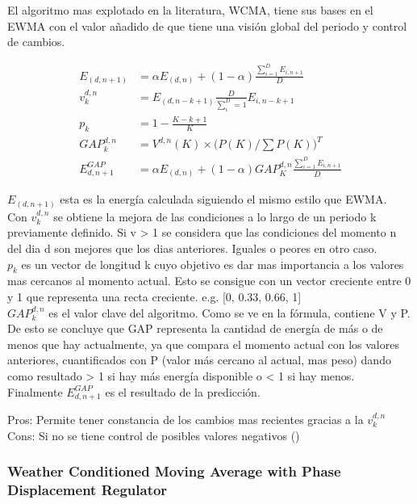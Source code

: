 El algoritmo mas explotado en la literatura, WCMA, tiene sus bases en el EWMA con el valor añadido de que tiene una visión global del periodo y control de cambios.



\begin{align}
	E_{(d,n+1)} &= \alpha E_{(d,n)} + (1-\alpha) \frac  {\sum_{i=1}^D E_{i,n+1}} {D} \\
	v^{d,n}_k &= E_{(d,n-k+1)} \frac {D}{\sum^D_i=1} E_{i,n-k+1} \\
	p_k &= 1-\frac {K-k+1}{K} \\
	GAP_k^{d,n} &= V^{d,n}(K) \times \big(P(K) / \sum P(K) \big)^T \\
	E^{GAP}_{d,n+1} &= \alpha E_(d,n) + (1-\alpha) GAP_K^{d,n} \frac{\sum^D_{i=1} E_{i,n+1}}{D}
\end{align}

$E_{(d,n+1)}$ esta es la energía calculada siguiendo el mismo estilo que EWMA. \\
Con $v^{d,n}_k$ se obtiene la mejora de las condiciones a lo largo de un periodo k previamente definido. Si v > 1 se considera que las condiciones del momento n del dia d son mejores que los dias anteriores. Iguales o peores en otro caso. \\ 
$p_k$ es un vector de longitud k cuyo objetivo es dar mas importancia a los valores mas cercanos al momento actual. Esto se consigue con un vector creciente entre 0 y 1 que representa una recta creciente. e.g. [0, 0.33, 0.66, 1] \\
$GAP_k^{d,n}$ es el valor clave del algoritmo. Como se ve en la fórmula, contiene V y P. De esto se concluye que GAP representa la cantidad de energía de más o de menos que hay actualmente, ya que compara el momento actual con los valores anteriores, cuantificados con P (valor más cercano al actual, mas peso) dando como resultado > 1 si hay más energía disponible o < 1 si hay menos. \\
Finalmente $E^{GAP}_{d,n+1}$ es el resultado de la predicción.


Pros: Permite tener constancia de los cambios mas recientes gracias a la $v^{d,n}_k$ \\
Cons: Si no se tiene control de posibles valores negativos ()


\subsubsection{ Weather Conditioned Moving Average with Phase Displacement Regulator} 
\label{ssub:subsubsection_name}

